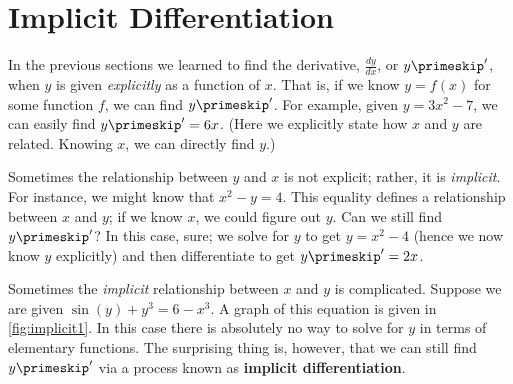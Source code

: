 \section{Implicit Differentiation}\label{sec:imp_deriv}

In the previous sections we learned to find the derivative, $ \frac{dy}{dx}$, or $y\primeskip'$, when $y$ is given \emph{explicitly} as a function of $x$. That is, if we know $y=f(x)$ for some function $f$, we can find $y\primeskip'$. For example, given  $y=3x^2-7$, we can easily find $y\primeskip'=6x$. (Here we explicitly state how $x$ and $y$ are related. Knowing $x$, we can directly find $y$.)

Sometimes the relationship between $y$ and $x$ is not explicit; rather, it is \emph{implicit}. For instance, we might know that $x^2-y=4$. This equality defines a relationship between $x$ and $y$; if we know $x$, we could figure out $y$. Can we still find $y\primeskip'$?  In this case, sure; we  solve for $y$ to get $y=x^2-4$ (hence we now know $y$ explicitly)  and then differentiate to get $y\primeskip'=2x$.

Sometimes the \emph{implicit} relationship between $x$ and $y$ is complicated.  Suppose we are given $\sin(y)+y^3=6-x^3$. A graph of this equation is given in \autoref{fig:implicit1}. In this case there is absolutely no way to solve for $y$ in terms of elementary functions.  The surprising thing is, however, that we can still find $y\primeskip'$ via a process known as \textbf{implicit differentiation}.


